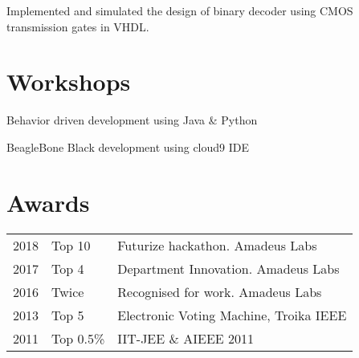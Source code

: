 \documentclass[]{Resume_Piyush}
\begin{document}
\begin{minipage}[t]{0.66\textwidth}
Implemented and simulated the design of binary decoder using CMOS transmission gates in VHDL.
\sectionsep


\section{Workshops}
Behavior driven development using Java \& Python
\sectionsep

BeagleBone Black development using cloud9 IDE
\sectionsep


\section{Awards} 
\begin{tabular}{rll}
2018  &  Top 10  &  Futurize hackathon. Amadeus Labs\\
2017  &  Top 4  & Department Innovation. Amadeus Labs\\
2016  &  Twice & Recognised for work. Amadeus Labs\\
2013  &  Top 5 & Electronic Voting Machine, Troika IEEE\\
2011  &  Top 0.5\% & IIT-JEE \& AIEEE 2011\\
\end{tabular}
\sectionsep


\end{minipage} 
\end{document}
